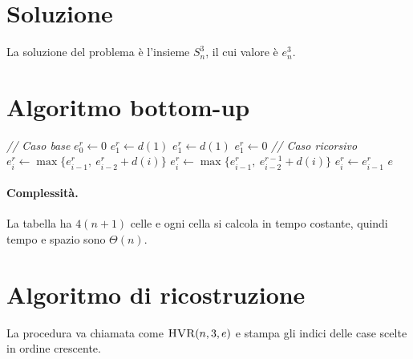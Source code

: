 \section{Soluzione}

La soluzione del problema è l'insieme $S_n^3$, il cui valore è $e_n^3$.

\section{Algoritmo bottom-up}

\begin{algorithm}[ht]
\caption{Calcolo della tabella $e$ (bottom-up)}
\begin{algorithmic}[1]
  \State \textit{// Caso base}
    \State $e_0^r \gets 0$
      \State $e_1^r \gets d(1)$
    \Else
        \State $e_1^r \gets d(1)$
      \Else
        \State $e_1^r \gets 0$
      \EndIf
    \EndIf
  \EndFor
  \State \textit{// Caso ricorsivo}
        \State $e_i^r \gets \max\{e_{i-1}^r,\ e_{i-2}^r + d(i)\}$
      \Else
          \State $e_i^r \gets \max\{e_{i-1}^r,\ e_{i-2}^{r-1} + d(i)\}$
        \Else
          \State $e_i^r \gets e_{i-1}^r$
        \EndIf
      \EndIf
    \EndFor
  \EndFor
  \State \Return $e$
\EndProcedure
\end{algorithmic}
\end{algorithm}

\paragraph{Complessità.} La tabella ha $4(n+1)$ celle e ogni cella si calcola in
tempo costante, quindi tempo e spazio sono $\Theta(n)$.

\section{Algoritmo di ricostruzione}

La procedura va chiamata come $\textsc{HVR}(n, 3, e)$ e stampa gli indici delle case
scelte in ordine crescente.

